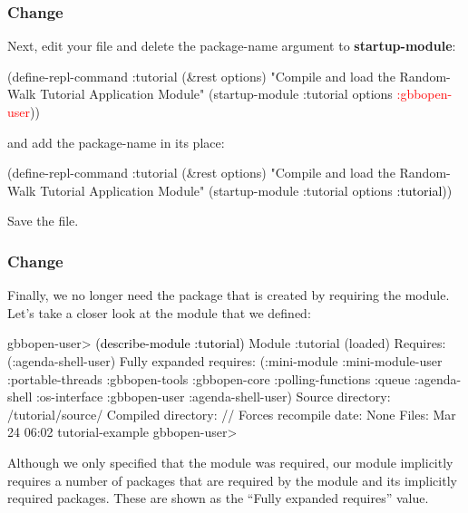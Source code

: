 \documentclass[10pt,twoside,english,pdftex]{article}
\begin{document}
\subsubsection*{Change }
%
Next, edit your  file and delete the 
package-name argument to \textbf{startup-module}:
%
\W\supp
\begin{example}
\textcolor{darkergray}{%
  (define-repl-command :tutorial (\&rest options)
    "Compile and load the Random-Walk Tutorial Application Module"
    (startup-module :tutorial options \textcolor{red}{:gbbopen-user}))}
\end{example}
%
and add the package-name  in its place:
%
\W\supp\notpretop
\begin{example}
\textcolor{darkergray}{%
  (define-repl-command :tutorial (\&rest options)
    "Compile and load the Random-Walk Tutorial Application Module"
    (startup-module :tutorial options \textcolor{black}{:tutorial}))}
\end{example}
%
Save the file.

\subsubsection*{Change }

%
%
Finally, we no longer need the  package that is created by
requiring the  module.  Let's take a closer look at
the  module that we defined:
%
\W\supp
\begin{example}
\textcolor{darkergray}{%
  gbbopen-user> \textcolor{black}{(describe-module :tutorial)}
  Module :tutorial (loaded)
    Requires: (:agenda-shell-user)
    Fully expanded requires: (:mini-module :mini-module-user :portable-threads
                              :gbbopen-tools :gbbopen-core :polling-functions
                              :queue :agenda-shell :os-interface :gbbopen-user
                              :agenda-shell-user)
    Source directory: /tutorial/source/
    Compiled directory: //
    Forces recompile date: None
    Files: Mar 24 06:02 tutorial-example
  gbbopen-user>}
\end{example}
%
Although we only specified that the  module was
required, our  module implicitly requires a number of packages
that are required by the  module and its implicitly
required packages.  These are shown as the ``Fully expanded requires'' value.
\end{document}

